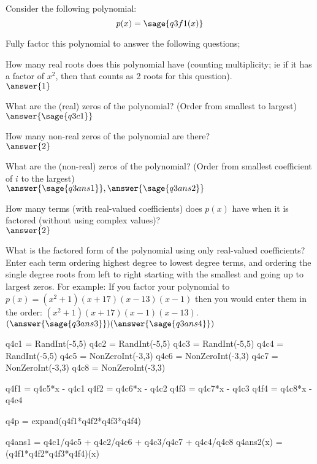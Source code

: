 \documentclass{ximera}
\begin{document}
\begin{problem}
Consider the following polynomial:
\[
p(x) = \sage{q3f1(x)}
\]

Fully factor this polynomial to answer the following questions;

How many real roots does this polynomial have (counting multiplicity; ie if it has a factor of $x^2$, then that counts as 2 roots for this question). \\
$\answer{1}$

\begin{problem}
    What are the (real) zeros of the polynomial? (Order from smallest to largest)\\
    $\answer{\sage{q3c1}}$
\end{problem}

How many non-real zeros of the polynomial are there?\\
$\answer{2}$

\begin{problem}
    What are the (non-real) zeros of the polynomial? (Order from smallest coefficient of $i$ to the largest)\\
    $\answer{\sage{q3ans1}}, \answer{\sage{q3ans2}}$
\end{problem}

How many terms (with real-valued coefficients) does $p(x)$ have when it is factored (without using complex values)?\\
$\answer{2}$
\begin{problem}

What is the factored form of the polynomial using only real-valued coefficients?\\
Enter each term ordering highest degree to lowest degree terms, and ordering the single degree roots from left to right starting with the smallest and going up to largest zeros. For example: If you factor your polynomial to $p(x) = (x^2 + 1)(x+17)(x-13)(x-1)$ then you would enter them in the order: $(x^2+1)(x+17)(x-1)(x-13)$.\\
$(\answer{\sage{q3ans3}})(\answer{\sage{q3ans4}})$
\end{problem}
\end{problem}


\begin{sagesilent}
q4c1 = RandInt(-5,5)
q4c2 = RandInt(-5,5)
q4c3 = RandInt(-5,5)
q4c4 = RandInt(-5,5)
q4c5 = NonZeroInt(-3,3)
q4c6 = NonZeroInt(-3,3)
q4c7 = NonZeroInt(-3,3)
q4c8 = NonZeroInt(-3,3)

q4f1 = q4c5*x - q4c1
q4f2 = q4c6*x - q4c2
q4f3 = q4c7*x - q4c3
q4f4 = q4c8*x - q4c4

q4p = expand(q4f1*q4f2*q4f3*q4f4)

q4ans1 = q4c1/q4c5 + q4c2/q4c6 + q4c3/q4c7 + q4c4/q4c8
q4ans2(x) = (q4f1*q4f2*q4f3*q4f4)(x)
\end{sagesilent}
\end{document}
